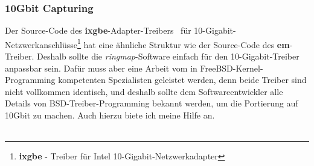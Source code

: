 \subsubsection{10Gbit Capturing}
Der Source-Code des \textbf{ixgbe}-Adapter-Treibers~\cite{10gbit_adapter_bsd}
für 10-Gigabit-Netzwerkanschlüsse\footnote{\textbf{ixgbe} - Treiber für Intel
10-Gigabit-Netzwerkadapter} hat eine ähnliche Struktur wie der Source-Code des
\textbf{em}-Treiber. Deshalb sollte die \emph{ringmap}-Software einfach für den
10-Gigabit-Treiber anpassbar sein. Dafür muss aber eine Arbeit vom in
FreeBSD-Kernel-Programming kompetenten Spezialisten geleistet werden, denn
beide Treiber sind nicht vollkommen identisch, und deshalb sollte dem
Softwareentwickler alle Details von BSD-Treiber-Programming bekannt werden, um
die Portierung auf 10Gbit zu machen. Auch hierzu biete ich meine Hilfe an.\\\\
